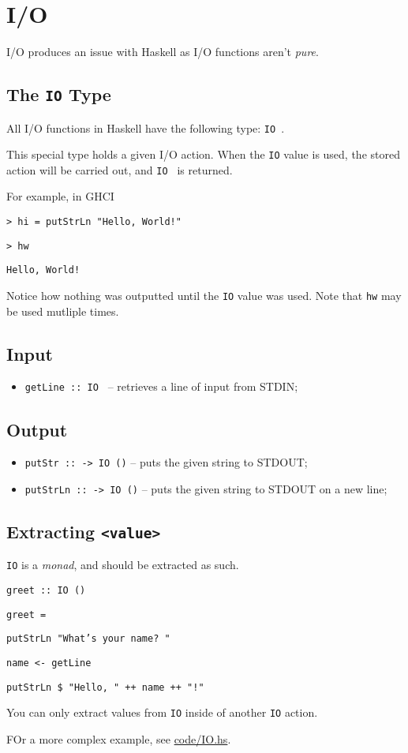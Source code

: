\section{I/O}

I/O produces an issue with Haskell as I/O functions aren't \textit{pure}.

\subsection{The \texttt{IO} Type}
All I/O functions in Haskell have the following type: \texttt{IO }.

This special type holds a given I/O action. When the \texttt{IO} value is used, the stored action will be carried out, and \texttt{IO } is returned.

For example, in GHCI

\texttt{> hi = putStrLn "Hello, World!"}

\texttt{> hw}

\texttt{Hello, World!}

Notice how nothing was outputted until the \texttt{IO} value was used. Note that \texttt{hw} may be used mutliple times.

\subsection{Input}
\begin{itemize}
  \item \texttt{getLine :: IO } -- retrieves a line of input from STDIN;
\end{itemize}

\subsection{Output}
\begin{itemize}
  \item \texttt{putStr ::  -> IO ()} -- puts the given string to STDOUT;
  \item \texttt{putStrLn ::  -> IO ()} -- puts the given string to STDOUT on a new line;
\end{itemize}

\subsection{Extracting \texttt{<value>}}
\texttt{IO} is a \textit{monad}, and should be extracted as such.

\texttt{greet :: IO ()}

\texttt{greet = }

\quad\texttt{putStrLn "What's your name? "}

\quad\texttt{name <- getLine}

\quad\texttt{putStrLn \$ "Hello, " ++ name ++ "!"}

You can only extract values from \texttt{IO} inside of another \texttt{IO} action.

FOr a more complex example, see \url{code/IO.hs}.